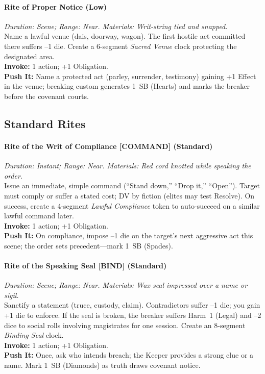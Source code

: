 \paragraph{Rite of Proper Notice (Low)}%
\emph{Duration: Scene; Range: Near. Materials: Writ-string tied and snapped.}\\
Name a lawful venue (dais, doorway, wagon). The first hostile act committed there suffers --1 die. Create a 6-segment \emph{Sacred Venue} clock protecting the designated area.\\
\textbf{Invoke:} 1 action; +1 Obligation.\\
\textbf{Push It:} Name a protected act (parley, surrender, testimony) gaining +1 Effect in the venue; breaking custom generates 1~SB (Hearts) and marks the breaker before the covenant courts.

\subsection*{Standard Rites}

\paragraph{Rite of the Writ of Compliance [COMMAND] (Standard)}%
\emph{Duration: Instant; Range: Near. Materials: Red cord knotted while speaking the order.}\\
Issue an immediate, simple command (``Stand down,'' ``Drop it,'' ``Open''). Target must comply or suffer a stated cost; DV by fiction (elites may test Resolve). On success, create a 4-segment \emph{Lawful Compliance} token to auto-succeed on a similar lawful command later.\\
\textbf{Invoke:} 1 action; +1 Obligation.\\
\textbf{Push It:} On compliance, impose --1 die on the target’s next aggressive act this scene; the order sets precedent—mark 1~SB (Spades).

\paragraph{Rite of the Speaking Seal [BIND] (Standard)}%
\emph{Duration: Scene; Range: Near. Materials: Wax seal impressed over a name or sigil.}\\
Sanctify a statement (truce, custody, claim). Contradictors suffer --1 die; you gain +1 die to enforce. If the seal is broken, the breaker suffers Harm~1 (Legal) and --2 dice to social rolls involving magistrates for one session. Create an 8-segment \emph{Binding Seal} clock.\\
\textbf{Invoke:} 1 action; +1 Obligation.\\
\textbf{Push It:} Once, ask who intends breach; the Keeper provides a strong clue or a name. Mark 1~SB (Diamonds) as truth draws covenant notice.

